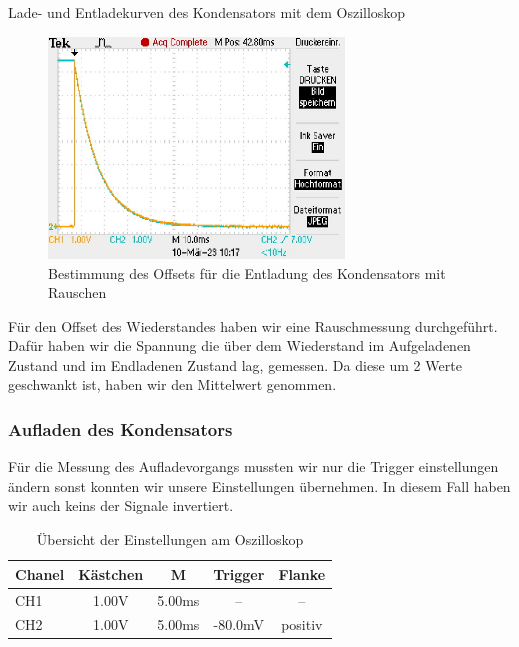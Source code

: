 \documentclass[twoside]{protokoll}
\begin{document}
\begin{aufgabe}{Lade- und Entladekurven des Kondensators mit dem Oszilloskop}
\begin{figure}[H]
  \centering
    \includegraphics[width=0.7\textwidth]{Bilder_Osziloskop/Entladen_Wiederstand_Offset.pdf}
    \caption{Bestimmung des Offsets für die Entladung des Kondensators mit Rauschen}
  \centering
\end{figure}
Für den Offset des Wiederstandes haben wir eine Rauschmessung durchgeführt.
Dafür haben wir die Spannung die über dem Wiederstand im Aufgeladenen Zustand  und im Endladenen Zustand lag, gemessen.
Da diese um 2 Werte geschwankt ist, haben wir den Mittelwert genommen.

 \subsubsection{Aufladen des Kondensators}
 
 
Für die Messung des Aufladevorgangs mussten wir nur die Trigger einstellungen ändern sonst konnten wir unsere Einstellungen übernehmen. In diesem Fall haben wir auch keins der Signale invertiert. 

\begin{table}[H]
        \centering
        \begin{tabularx}{0.8\textwidth}{X c c c c} %
            \toprule
            \textbf{Chanel} & \textbf{Kästchen} & \textbf{M} & \textbf{Trigger} & \textbf{Flanke} \\
            \midrule
            CH1 & 1.00V & 5.00ms & -- & -- \\
            CH2 & 1.00V & 5.00ms & -80.0mV & positiv \\
            \bottomrule
        \end{tabularx}
        \caption{Übersicht der Einstellungen am Oszilloskop}
        \label{tab:mytable}
    \end{table}
    

\end{aufgabe}
\end{document}

